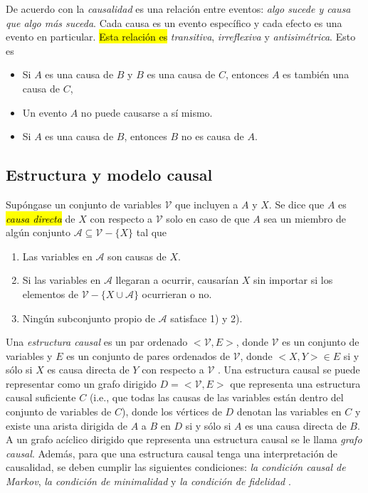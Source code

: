 De acuerdo con \cite{spirtes2000causation} la \textit{causalidad}
es una relación entre eventos: \textit{algo sucede y causa que algo más suceda}. Cada causa es un evento específico y cada efecto es una evento
en particular. \hl{Esta relación es} \textit{transitiva}, \textit{irreflexiva} y \textit{antisimétrica}. Esto es 
\begin{itemize}
    \item Si $A$ es una causa de $B$ y $B$ es una causa de $C$, entonces
    $A$ es también una causa de $C$,
    \item Un evento $A$ no puede causarse a sí mismo.
    \item Si $A$ es una causa de $B$, entonces $B$ no es causa de $A$.
\end{itemize}

\subsection{Estructura y modelo causal}

Supóngase un conjunto de variables $\mathcal{V}$ que incluyen a $A$ y $X$. 
Se dice que $A$ es \hl{\textit{causa directa}} de $X$ con respecto a $\mathcal{V}$
solo en caso de que $A$ sea un miembro de algún conjunto 
$\mathcal{A} \subseteq \mathcal{V} - \{X\}$ tal que 

\begin{enumerate}
    \item Las variables en $\mathcal{A}$ son causas de $X$.
    \item Si las variables en $\mathcal{A}$ llegaran a ocurrir,
    causarían $X$ sin importar si los elementos de $\mathcal{V} - \{X \cup \mathcal{A}\}$ ocurrieran o no.
    \item Ningún subconjunto propio de $\mathcal{A}$ satisface
    1) y 2).
\end{enumerate}

Una \textit{estructura causal} es un par ordenado $<\mathcal{V}, E>$, donde
$\mathcal{V}$ es un conjunto de variables y $E$ es un conjunto
de pares ordenados de $\mathcal{V}$, donde $<X, Y> \in E$ si
y sólo si $X$ es causa directa de $Y$ con respecto a  
$\mathcal{V}$ \cite{spirtes2000causation}.
Una estructura causal se puede representar como un grafo
dirigido $D = <\mathcal{V},E>$ que representa una estructura causal suficiente $C$ (i.e., que todas las causas de las variables están dentro del conjunto de variables de $C$), donde los vértices de $D$ denotan las variables en $C$ y existe una
arista dirigida de $A$ a $B$ en $D$ si y sólo si $A$ es
una causa directa de $B$.
A un grafo acíclico dirigido que representa una estructura causal se le llama \textit{grafo causal}.
Además, para que una estructura causal tenga una interpretación de causalidad, se deben cumplir las 
siguientes condiciones: \textit{la condición causal de Markov}, \textit{la condición de minimalidad} y \textit{la condición
de fidelidad} \cite{gonzalez-soto, spirtes2000causation}.

